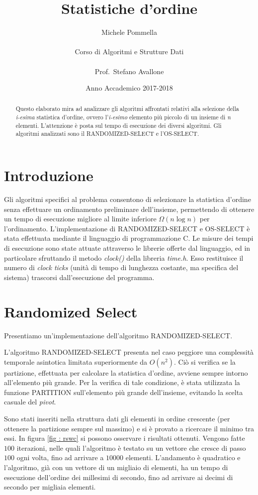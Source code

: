 \documentclass[12pt, a4paper]{article}
\title{Statistiche d'ordine}
\author{Michele Pommella\\ \\Corso di Algoritmi e Strutture Dati\\ \\Prof.~Stefano Avallone}
\date{Anno Accademico 2017-2018}
\begin{document}
\maketitle

\begin{abstract}
	Questo elaborato mira ad analizzare gli algoritmi affrontati relativi alla selezione della \emph{i-esima} statistica d'ordine, ovvero l'\emph{i-esimo} elemento più piccolo di un insieme di \emph{n} elementi. L'attenzione è posta sul tempo di esecuzione dei diversi algoritmi. Gli algoritmi analizzati sono il \textrm{RANDOMIZED-SELECT} e l'\textrm{OS-SELECT}.
\end{abstract}

\section{Introduzione}
	\label{sec : intro}
	 Gli algoritmi specifici al problema consentono di selezionare la statistica d'ordine senza effettuare un ordinamento preliminare dell'insieme, permettendo di ottenere un tempo di esecuzione migliore al limite inferiore $\Omega(n\log{n})$ per l'ordinamento. L'implementazione di \textrm{RANDOMIZED-SELECT} e \textrm{OS-SELECT} è stata effettuata mediante il linguaggio di programmazione \textrm{C}. Le misure dei tempi di esecuzione sono state attuate attraverso le librerie offerte dal linguaggio, ed in particolare sfruttando il metodo \emph{clock()} della libreria \emph{time.h}. Esso restituisce il numero di \emph{clock ticks} (unità di tempo di lunghezza costante, ma specifica del sistema) trascorsi dall'esecuzione del programma.

\section{Randomized Select}
	\label{sec : rs}
	Presentiamo un'implementazione dell'algoritmo \textrm{RANDOMIZED-SELECT}.
	
	L'algoritmo \textrm{RANDOMIZED-SELECT} presenta nel caso peggiore una complessità temporale asintotica limitata superiormente da $O(n^{2})$. Ciò si verifica se la partizione, effettuata per calcolare la statistica d'ordine, avviene sempre intorno all'elemento più grande. Per la verifica di tale condizione, è stata utilizzata la funzione \textrm{PARTITION} sull'elemento più grande dell'insieme, evitando la scelta casuale del \emph{pivot}.
	
	Sono stati inseriti nella struttura dati gli elementi in ordine crescente (per ottenere la partizione sempre sul massimo) e si è provato a ricercare il minimo tra essi. In figura \ref{fig : rswc} si possono osservare i risultati ottenuti. Vengono fatte $100$ iterazioni, nelle quali l'algoritmo è testato su un vettore che cresce di passo $100$ ogni volta, fino ad arrivare a $10000$ elementi. L'andamento è quadratico e l'algoritmo, già con un vettore di un migliaio di elementi, ha un tempo di esecuzione dell'ordine dei millesimi di secondo, fino ad arrivare ai decimi di secondo per migliaia elementi.
	
\end{document}

